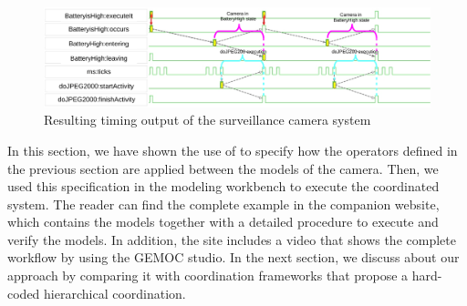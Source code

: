 		\begin{figure}[h]
			\center
			\includegraphics[width=1\columnwidth]{examples/figs/vcdcamera}
			\caption{Resulting timing output of the surveillance camera system}
			\label{fig:camerasystem}
		\end{figure}


In this section, we have shown the use of \bflow to specify how the operators defined in the previous section are applied between the models of the camera. Then, we used this specification in the modeling workbench to execute the coordinated system. The reader can find the complete example in the companion website, which contains the models together with a detailed procedure to execute and verify the models. In addition, the site includes a video that shows the complete workflow by using the GEMOC studio. In the next section, we discuss about our approach by comparing it with coordination frameworks that propose a hard-coded hierarchical coordination.  

	
	
	